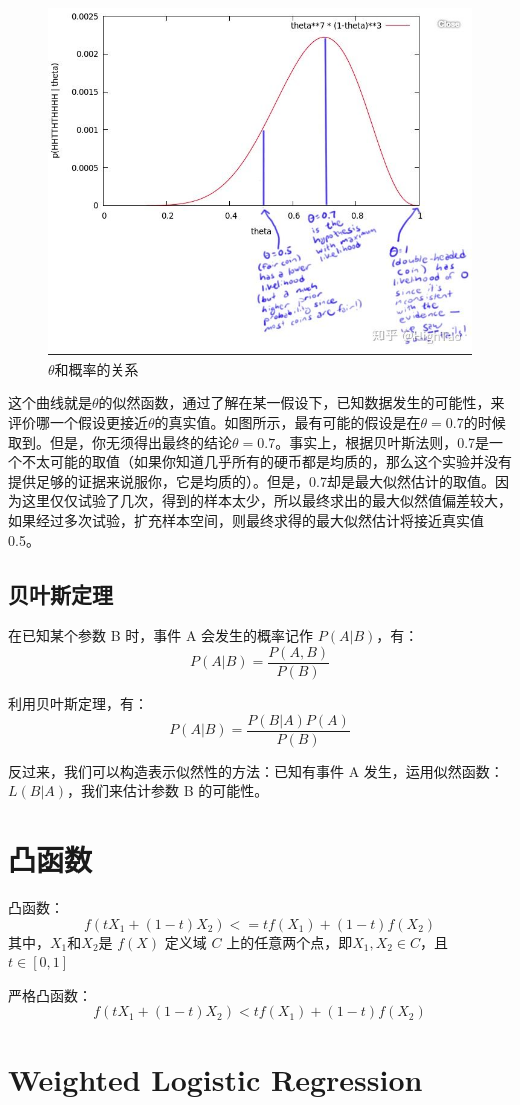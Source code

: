 \documentclass[12pt]{article}
\begin{document}
\begin{figure}[H]
  \centering
  \includegraphics[width=.5\textwidth]{fig/Likelihood_theta_distribution.jpg} %
  \caption*{$\theta$和概率的关系} %
  \label{Likelihood_theta_distribution} %
\end{figure}

这个曲线就是$\theta$的似然函数，通过了解在某一假设下，已知数据发生的可能性，来评价哪一个假设更接近$\theta$的真实值。如图所示，最有可能的假设是在$\theta = 0.7$的时候取到。但是，你无须得出最终的结论$\theta = 0.7$。事实上，根据贝叶斯法则，0.7是一个不太可能的取值（如果你知道几乎所有的硬币都是均质的，那么这个实验并没有提供足够的证据来说服你，它是均质的）。但是，0.7却是最大似然估计的取值。因为这里仅仅试验了几次，得到的样本太少，所以最终求出的最大似然值偏差较大，如果经过多次试验，扩充样本空间，则最终求得的最大似然估计将接近真实值0.5。

\subsection{贝叶斯定理}
在已知某个参数 B 时，事件 A 会发生的概率记作 $P(A|B)$，有：
$$ P(A|B) = \frac{P(A,B)}{P(B)}$$

利用贝叶斯定理，有：
$$ P(A|B) = \frac{P(B|A)P(A)}{P(B)} $$

反过来，我们可以构造表示似然性的方法：已知有事件 A 发生，运用似然函数：$L(B|A)$，我们来估计参数 B 的可能性。

\section{凸函数}
凸函数：
$$f(tX_1 + (1-t)X_2) <= tf(X_1) + (1-t)f(X_2)$$
其中，$X_1$和$X_2$是 $f(X)$ 定义域 $C$ 上的任意两个点，即$X_1,X_2 \in C$，且 $t \in [0,1]$

严格凸函数：
$$f(tX_1 + (1-t)X_2) < tf(X_1) + (1-t)f(X_2)$$

\section{Weighted Logistic Regression\cite{Logistic_Regression_Solve_Problem_Using_Lines}}
\end{document}

